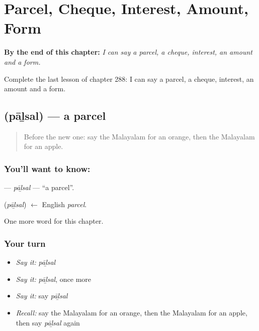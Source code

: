 
\chapter{Parcel, Cheque, Interest, Amount, Form}
\label{ch:ml-parcel-cheque-interest-amount-form}

\begin{chapteropening}
\textbf{By the end of this chapter:} \emph{I can say a parcel, a cheque, interest, an amount and a form.}

Complete the last lesson of chapter 288: I can say a parcel, a cheque, interest, an amount and a form.
\end{chapteropening}

\section[\texorpdfstring{\ml{പാഴ്സൽ} (pāḻsal)}{പാഴ്സൽ (pāḻsal)}]{ (pāḻsal) — a parcel}

\label{lesson:ML-C288-palsal}



\begin{quote}
Before the new one: say the Malayalam for an orange, then the Malayalam for an apple.
\end{quote}

\subsection*{You'll want to know: }
\textbf{} — \emph{pāḻsal} — \textquotedblleft{}a parcel\textquotedblright{}.

\begin{cousinweb}
\textbf{} (\emph{pāḻsal}) $\leftarrow$ English \emph{parcel}.
\end{cousinweb}

\begin{grammarlens}[title={What you've built}]
One more word for this chapter.
\end{grammarlens}

\subsection*{Your turn}
\begin{itemize}
\raggedright
  \item \emph{Say it:} \emph{pāḻsal}
  \item \emph{Say it:} \emph{pāḻsal}, once more
  \item \emph{Say it:} say \emph{pāḻsal}
  \item \emph{Recall:} say the Malayalam for an orange, then the Malayalam for an apple, then say \emph{pāḻsal} again
\end{itemize}

